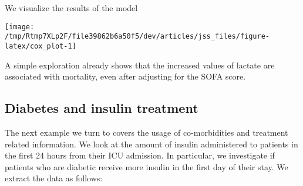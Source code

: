 \documentclass[
]{jss}
\begin{document}
We visualize the results of the model

\begin{CodeChunk}


\begin{center}\texttt{[image: /tmp/Rtmp7XLp2F/file39862b6a50f5/dev/articles/jss\_files/figure-latex/cox\_plot-1]} \end{center}

\end{CodeChunk}

A simple exploration already shows that the increased values of lactate
are associated with mortality, even after adjusting for the SOFA score.

\hypertarget{diabetes-and-insulin-treatment}{%
\subsection{Diabetes and insulin
treatment}\label{diabetes-and-insulin-treatment}}

The next example we turn to covers the usage of co-morbidities and
treatment related information. We look at the amount of insulin
administered to patients in the first 24 hours from their ICU admission.
In particular, we investigate if patients who are diabetic receive more
insulin in the first day of their stay. We extract the data as follows:
\end{document}

